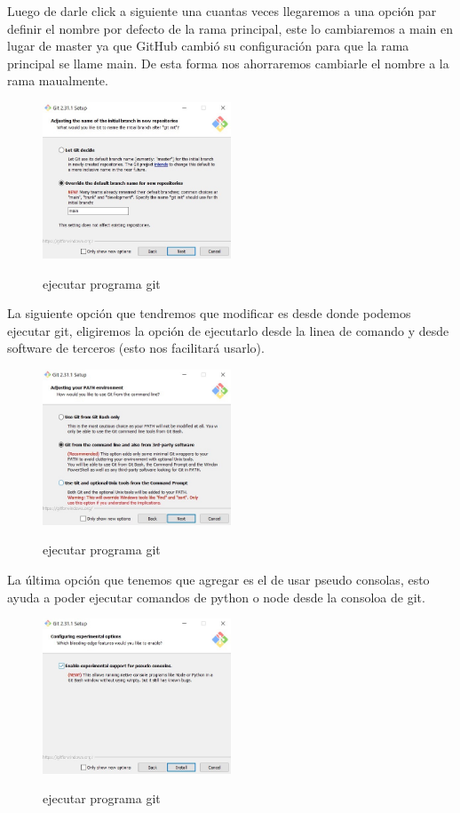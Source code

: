 \documentclass[11pt, oneside]{article}
\begin{document}
Luego de darle click a siguiente una cuantas veces llegaremos a una opción par definir el nombre por defecto de la rama principal, este lo cambiaremos a main en lugar de master ya que GitHub cambió su configuración para que la rama principal se llame main. De esta forma nos ahorraremos cambiarle el nombre a la rama maualmente.

\begin{figure}[h]
  \centering
  \caption{ejecutar programa git}
  \includegraphics[width=0.50\textwidth]{./img/win/ins-win-3.jpeg}
  \label{fig:git-ins-3}
\end{figure}

La siguiente opción que tendremos que modificar es desde donde podemos ejecutar git, eligiremos la opción de ejecutarlo desde la linea de comando y desde software de terceros (esto nos facilitará usarlo).

\begin{figure}[h]
  \centering
  \caption{ejecutar programa git}
  \includegraphics[width=0.50\textwidth]{./img/win/ins-win-4.jpeg}
  \label{fig:git-ins-4}
\end{figure}

La última opción que tenemos que agregar es el de usar pseudo consolas, esto ayuda a poder ejecutar comandos de python o node desde la consoloa de git.

\begin{figure}[h]
  \centering
  \caption{ejecutar programa git}
  \includegraphics[width=0.50\textwidth]{./img/win/ins-win-5.jpeg}
  \label{fig:git-ins-5}
\end{figure}
\end{document}
